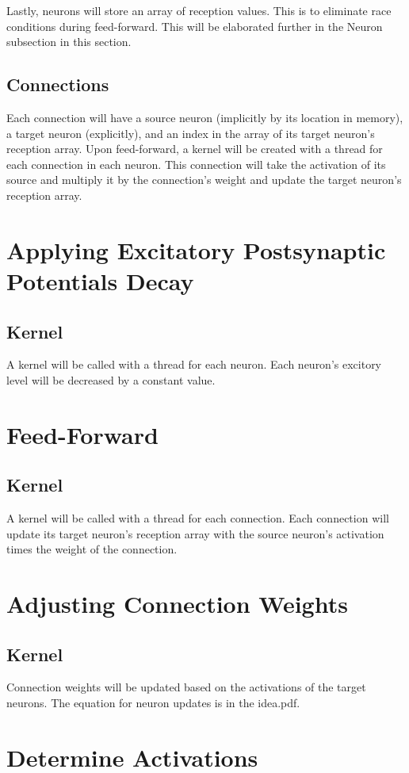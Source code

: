 \documentclass{article} %
\begin{document}
            Lastly, neurons will store an array of reception values. This is to eliminate race conditions during feed-forward. This will be elaborated further in the Neuron subsection in this section.
        \subsection{Connections}
            Each connection will have a source neuron (implicitly by its location in memory), a target neuron (explicitly), and an index in the array of its target neuron's reception array. Upon feed-forward, a kernel will be created with a thread for each connection in each neuron. This connection will take the activation of its source and multiply it by the connection's weight and update the target neuron's reception array.
    \section{Applying Excitatory Postsynaptic Potentials Decay}
        \subsection{Kernel}
            A kernel will be called with a thread for each neuron. Each neuron's excitory level will be decreased by a constant value.
    \section{Feed-Forward}
        \subsection{Kernel}
            A kernel will be called with a thread for each connection. Each connection will update its target neuron's reception array with the source neuron's activation times the weight of the connection.
    \section{Adjusting Connection Weights}
        \subsection{Kernel}
            Connection weights will be updated based on the activations of the target neurons. The equation for neuron updates is in the idea.pdf.
    \section{Determine Activations}
\end{document}
